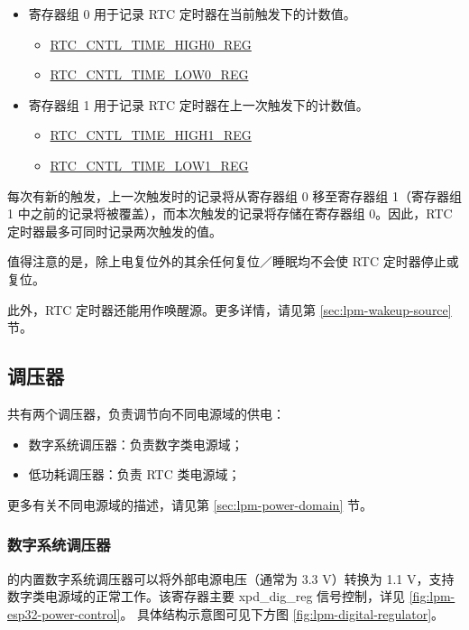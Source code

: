 \documentclass[main\_\_CN.tex]{subfiles}
\begin{document}
\begin{itemize}
\item 寄存器组 0 用于记录 RTC 定时器在当前触发下的计数值。
\begin{itemize}
\item \hyperref[regdesc:RTCCNTLTIMEHIGH0REG]{RTC\_CNTL\_TIME\_HIGH0\_REG}
\item \hyperref[regdesc:RTCCNTLTIMELOW0REG]{RTC\_CNTL\_TIME\_LOW0\_REG}
\end{itemize}
\item 寄存器组 1 用于记录 RTC 定时器在上一次触发下的计数值。
\begin{itemize}
\item \hyperref[regdesc:RTCCNTLTIMEHIGH1REG]{RTC\_CNTL\_TIME\_HIGH1\_REG} 
\item \hyperref[regdesc:RTCCNTLTIMELOW1REG]{RTC\_CNTL\_TIME\_LOW1\_REG}
\end{itemize}
\end{itemize}

每次有新的触发，上一次触发时的记录将从寄存器组 0 移至寄存器组 1（寄存器组 1 中之前的记录将被覆盖），而本次触发的记录将存储在寄存器组 0。因此，RTC 定时器最多可同时记录两次触发的值。

值得注意的是，除上电复位外的其余任何复位／睡眠均不会使 RTC 定时器停止或复位。

此外，RTC 定时器还能用作唤醒源。更多详情，请见第 \ref{sec:lpm-wakeup-source} 节。

\subsection{调压器}
\chipname{} 共有两个调压器，负责调节向不同电源域的供电：
\begin{itemize}
\item 数字系统调压器：负责数字类电源域；
\item 低功耗调压器：负责 RTC 类电源域；
\end{itemize}

\begin{tiplisting}
更多有关不同电源域的描述，请见第 \ref{sec:lpm-power-domain} 节。
\end{tiplisting}


\subsubsection{数字系统调压器}

\chipname{} 的内置数字系统调压器可以将外部电源电压（通常为 3.3 V）转换为 1.1 V，支持数字类电源域的正常工作。该寄存器主要 xpd\_dig\_reg 信号控制，详见 \ref{fig:lpm-esp32-power-control}。
具体结构示意图可见下方图 \ref{fig:lpm-digital-regulator}。
\end{document}
